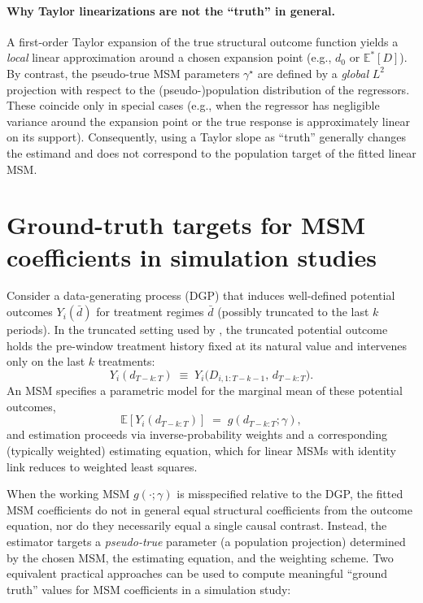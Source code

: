 \paragraph{Why Taylor linearizations are not the ``truth'' in general.}
A first-order Taylor expansion of the true structural outcome function yields a \emph{local} linear approximation around a chosen expansion point (e.g., $d_0$ or $\mathbb E^\ast[D]$). By contrast, the pseudo-true MSM parameters $\gamma^\star$ are defined by a \emph{global} $L^2$ projection with respect to the (pseudo-)population distribution of the regressors. These coincide only in special cases (e.g., when the regressor has negligible variance around the expansion point or the true response is approximately linear on its support). Consequently, using a Taylor slope as ``truth'' generally changes the estimand and does not correspond to the population target of the fitted linear MSM. 

\section{Ground-truth targets for MSM coefficients in simulation studies}
\label{sec:msm_ground_truth}

Consider a data-generating process (DGP) that induces well-defined potential outcomes
$Y_i(\bar d)$ for treatment regimes $\bar d$ (possibly truncated to the last $k$ periods).
In the truncated setting used by \cite{blackwellEffectPoliticalAdvertising2024}, the truncated potential
outcome holds the pre-window treatment history fixed at its natural value and intervenes
only on the last $k$ treatments:
\begin{equation}
Y_i(d_{T-k:T}) \;\equiv\; Y_i\!\big(D_{i,1:T-k-1},\, d_{T-k:T}\big).
\end{equation}
An MSM specifies a parametric model for the marginal mean of these potential outcomes,
\begin{equation}
\mathbb E\!\left[ Y_i(d_{T-k:T}) \right] \;=\; g\!\left(d_{T-k:T};\gamma\right),
\end{equation}
and estimation proceeds via inverse-probability weights and a corresponding (typically
weighted) estimating equation, which for linear MSMs with identity link reduces to
weighted least squares.

When the working MSM $g(\cdot;\gamma)$ is misspecified relative to the DGP, the fitted MSM
coefficients do not in general equal structural coefficients from the outcome equation,
nor do they necessarily equal a single causal contrast. Instead, the estimator targets a
\emph{pseudo-true} parameter (a population projection) determined by the chosen MSM, the
estimating equation, and the weighting scheme. Two equivalent practical approaches can be
used to compute meaningful ``ground truth'' values for MSM coefficients in a simulation
study:

